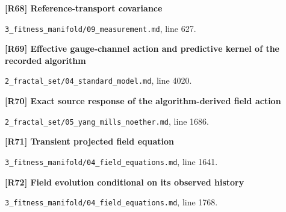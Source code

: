 \documentclass[11pt,a4paper]{article}
\begin{document}
\par\medskip\noindent\begin{minipage}{\linewidth}\textbf{[R68] Reference-transport covariance}\label{src:lem-reference-transport-covariance}\par
{\small\texttt{}\par
\nolinkurl{3_fitness_manifold/09_measurement.md}, line 627.\par}
\end{minipage}\par

\par\medskip\noindent\begin{minipage}{\linewidth}\textbf{[R69] Effective gauge-channel action and predictive kernel of the recorded algorithm}\label{src:thm-sm-effective-recorded-gauge-dynamics}\par
{\small\texttt{}\par
\nolinkurl{2_fractal_set/04_standard_model.md}, line 4020.\par}
\end{minipage}\par

\par\medskip\noindent\begin{minipage}{\linewidth}\textbf{[R70] Exact source response of the algorithm-derived field action}\label{src:thm-ym-native-source-response}\par
{\small\texttt{}\par
\nolinkurl{2_fractal_set/05_yang_mills_noether.md}, line 1686.\par}
\end{minipage}\par

\par\medskip\noindent\begin{minipage}{\linewidth}\textbf{[R71] Transient projected field equation}\label{src:thm-algorithmic-transient-field-memory}\par
{\small\texttt{}\par
\nolinkurl{3_fitness_manifold/04_field_equations.md}, line 1641.\par}
\end{minipage}\par

\par\medskip\noindent\begin{minipage}{\linewidth}\textbf{[R72] Field evolution conditional on its observed history}\label{src:thm-algorithmic-field-filter}\par
{\small\texttt{}\par
\nolinkurl{3_fitness_manifold/04_field_equations.md}, line 1768.\par}
\end{minipage}\par
\end{document}
